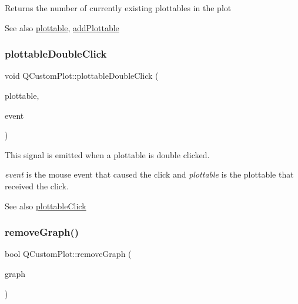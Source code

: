 Returns the number of currently existing plottables in the plot

\begin{DoxySeeAlso}{See also}
\mbox{\hyperlink{class_q_custom_plot_a32de81ff53e263e785b83b52ecd99d6f}{plottable}}, \mbox{\hyperlink{class_q_custom_plot_ab7ad9174f701f9c6f64e378df77927a6}{add\+Plottable}} 
\end{DoxySeeAlso}
\mbox{\label{class_q_custom_plot_af2e6f1cea923dae437681d01ce7d0c31}} 
\subsubsection{\texorpdfstring{plottable\+Double\+Click}{plottableDoubleClick}}
{\footnotesize\ttfamily void Q\+Custom\+Plot\+::plottable\+Double\+Click (\begin{DoxyParamCaption}\item[{\mbox{\hyperlink{class_q_c_p_abstract_plottable}{Q\+C\+P\+Abstract\+Plottable}} $\ast$}]{plottable,  }\item[{Q\+Mouse\+Event $\ast$}]{event }\end{DoxyParamCaption})\hspace{0.3cm}{\ttfamily [signal]}}

This signal is emitted when a plottable is double clicked.

{\itshape event} is the mouse event that caused the click and {\itshape plottable} is the plottable that received the click.

\begin{DoxySeeAlso}{See also}
\mbox{\hyperlink{class_q_custom_plot_a57e5efa8a854620e9bf62d31fc139f53}{plottable\+Click}} 
\end{DoxySeeAlso}
\mbox{\label{class_q_custom_plot_a903561be895fb6528a770d66ac5e6713}} 
\subsubsection{\texorpdfstring{remove\+Graph()}{removeGraph()}\hspace{0.1cm}{\footnotesize\ttfamily [1/2]}}
{\footnotesize\ttfamily bool Q\+Custom\+Plot\+::remove\+Graph (\begin{DoxyParamCaption}\item[{\mbox{\hyperlink{class_q_c_p_graph}{Q\+C\+P\+Graph}} $\ast$}]{graph }\end{DoxyParamCaption})}

